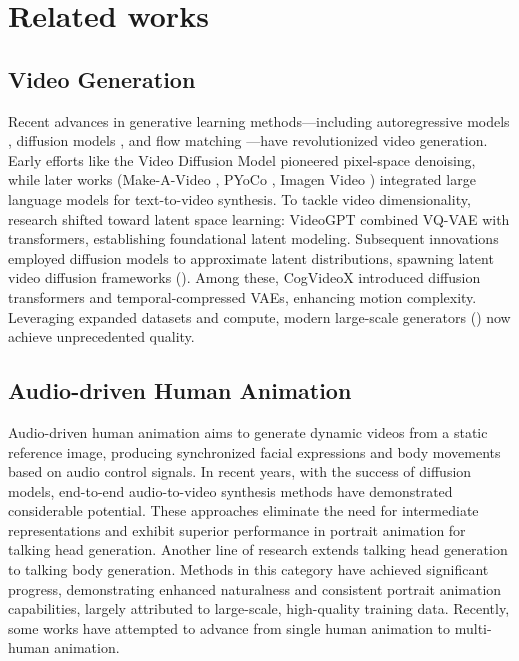 \section{Related works}
\subsection{Video Generation}

Recent advances in generative learning methods—including autoregressive models \cite{var}, diffusion models \cite{ddnm, ddim, im-ddpm}, and flow matching \cite{flowmatching}—have revolutionized video generation. Early efforts like the Video Diffusion Model \cite{video-dm} pioneered pixel-space denoising, while later works (Make-A-Video \cite{make-a-video}, PYoCo \cite{pyoco}, Imagen Video \cite{imagen-video}) integrated large language models for text-to-video synthesis. To tackle video dimensionality, research shifted toward latent space learning: VideoGPT \cite{VideoGPT} combined VQ-VAE \cite{vq-gan} with transformers, establishing foundational latent modeling. Subsequent innovations employed diffusion models to approximate latent distributions, spawning latent video diffusion frameworks (\cite{lvdm, magicvideo, make-your-vid, video-ldm, stable-video-diffusion, wang2023lavie, chen2023videocrafter1, chen2024videocrafter2}). Among these, CogVideoX \cite{yang2024cogvideox} introduced diffusion transformers and temporal-compressed VAEs, enhancing motion complexity. Leveraging expanded datasets and compute, modern large-scale generators (\cite{genmo2024mochi, kong2024hunyuanvideo, wan}) now achieve unprecedented quality.

\subsection{Audio-driven Human Animation}

Audio-driven human animation aims to generate dynamic videos from a static reference image, producing synchronized facial expressions and body movements based on audio control signals. In recent years, with the success of diffusion models, end-to-end audio-to-video synthesis methods \cite{tian2024emo,wei2024aniportrait,xu2024hallo,chen2025echomimic,cui2024hallo3,ji2024sonic,li2024latentsync,jiang2024loopy} have demonstrated considerable potential. These approaches eliminate the need for intermediate representations and exhibit superior performance in portrait animation for talking head generation. Another line of research extends talking head generation to talking body generation. Methods in this category \cite{lincyberhost,tian2025emo2,lin2025omnihuman,meng2024echomimicv2,gan2025omniavatar,wang2025fantasytalking} have achieved significant progress, demonstrating enhanced naturalness and consistent portrait animation capabilities, largely attributed to large-scale, high-quality training data. Recently, some works \cite{chen2025hunyuanvideo,kong2025let,huang2025bind} have attempted to advance from single human animation to multi-human animation.

